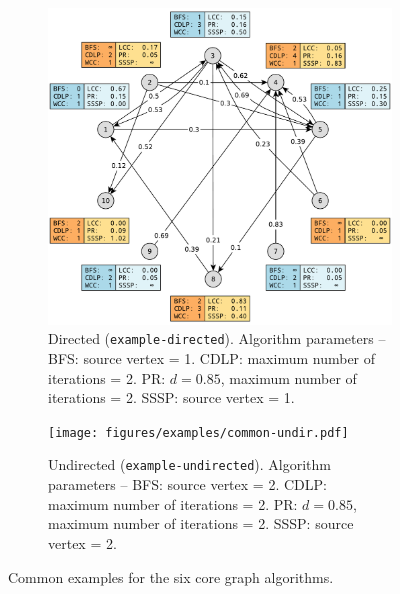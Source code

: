 \begin{figure}[h]
	\centering
	\begin{subfigure}{\textwidth}
		\centering
		\includegraphics[scale=\examplescale]{figures/examples/common-dir.pdf}
		\caption{Directed (\texttt{example-directed}).
			Algorithm parameters --
			BFS: source vertex = 1.
			CDLP: maximum number of iterations = 2.
			PR: $d = 0.85$, maximum number of iterations = 2.
			SSSP: source vertex = 1.}
	\end{subfigure}
	\begin{subfigure}{\textwidth}
		\centering
		\texttt{[image: figures/examples/common-undir.pdf]}
		\caption{Undirected (\texttt{example-undirected}).
			Algorithm parameters --
			BFS: source vertex = 2.
			CDLP: maximum number of iterations = 2.
			PR: $d = 0.85$, maximum number of iterations = 2.
			SSSP: source vertex = 2.}
	\end{subfigure}
	\caption{Common examples for the six core graph algorithms.}
	\label{fig:common_example}
\end{figure}
